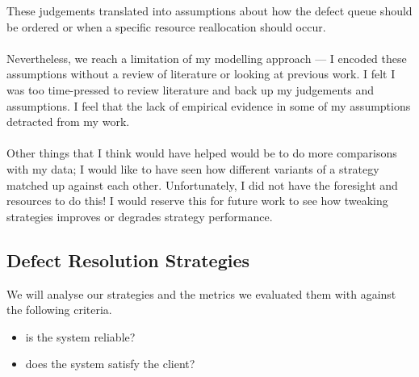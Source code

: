 These judgements translated into assumptions about how the defect queue should be ordered or when a
specific resource reallocation should occur.\\
\\
Nevertheless, we reach a limitation of my modelling approach --- I encoded these assumptions without
a review of literature or looking at previous work.
I felt I was too time-pressed to review literature and back up my judgements and assumptions.
I feel that the lack of empirical evidence in some of my assumptions detracted
from my work.\\
\\
Other things that I think would have helped would be to do more comparisons with
my data; I would like to have seen how different variants of a strategy matched
up against each other.
Unfortunately, I did not have the foresight and resources to do this!
I would reserve this for future work to see how tweaking strategies improves or
degrades strategy performance.

\subsection{Defect Resolution Strategies}

We will analyse our strategies and the metrics we evaluated them with against the following criteria.
\begin{itemize}
	\item is the system reliable?
	\item does the system satisfy the client?
\end{itemize}

